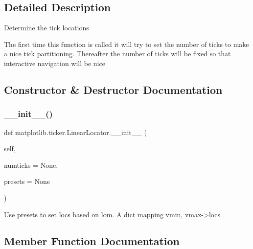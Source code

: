 \subsection{Detailed Description}
\begin{DoxyVerb}Determine the tick locations

The first time this function is called it will try to set the
number of ticks to make a nice tick partitioning.  Thereafter the
number of ticks will be fixed so that interactive navigation will
be nice\end{DoxyVerb}
 

\subsection{Constructor \& Destructor Documentation}
\mbox{\label{classmatplotlib_1_1ticker_1_1LinearLocator_a202095a556b3522a690f8992225f587a}} 
\subsubsection{\texorpdfstring{\+\_\+\+\_\+init\+\_\+\+\_\+()}{\_\_init\_\_()}}
{\footnotesize\ttfamily def matplotlib.\+ticker.\+Linear\+Locator.\+\_\+\+\_\+init\+\_\+\+\_\+ (\begin{DoxyParamCaption}\item[{}]{self,  }\item[{}]{numticks = {\ttfamily None},  }\item[{}]{presets = {\ttfamily None} }\end{DoxyParamCaption})}

\begin{DoxyVerb}Use presets to set locs based on lom.  A dict mapping vmin, vmax->locs
\end{DoxyVerb}
 

\subsection{Member Function Documentation}
\mbox{\label{classmatplotlib_1_1ticker_1_1LinearLocator_aaa22576e5f40a38c72f65ae24df24d7c}} 
